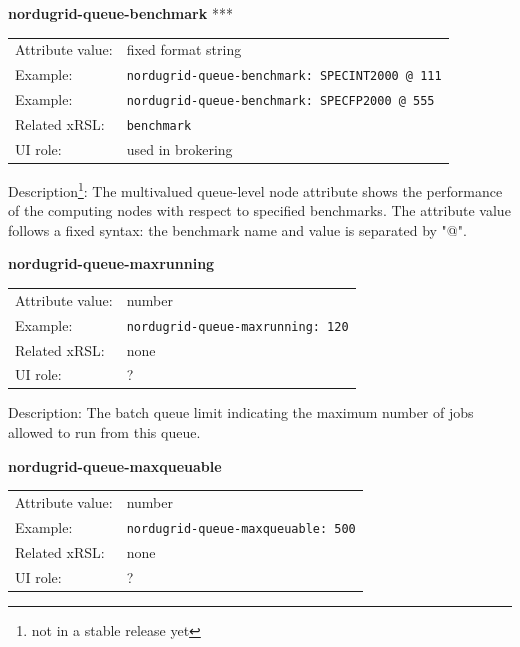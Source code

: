 \documentclass{article}
\begin{document}
  \hspace*{0.5cm}
  \begin{shaded}
    \textbf{nordugrid-queue-benchmark} ***
  \end{shaded}
  \begin{tabular}{lp{10cm}}  
    Attribute value:& fixed format string\\
    Example:& \verb#nordugrid-queue-benchmark: SPECINT2000 @ 111#\\
    Example:& \verb#nordugrid-queue-benchmark: SPECFP2000 @ 555#\\    
    Related xRSL:& \verb#benchmark#\\
    UI role:& used in brokering\\
  \end{tabular}

Description\footnote{not in a stable release yet}: The multivalued queue-level node attribute shows the 
performance of the computing nodes with respect to specified benchmarks.
The attribute value follows a fixed syntax: the benchmark name 
and value is separated by "@".



  \hspace*{0.5cm}
  \begin{shaded}
    \textbf{nordugrid-queue-maxrunning}
  \end{shaded}
  \begin{tabular}{lp{10cm}}  
    Attribute value:& number\\
    Example:& \verb#nordugrid-queue-maxrunning: 120#\\
    Related xRSL:& none\\
    UI role:& ?\\
  \end{tabular}

Description: The batch queue limit indicating the 
maximum number of jobs allowed to run from this queue.



  \hspace*{0.5cm}
  \begin{shaded}
    \textbf{nordugrid-queue-maxqueuable}
  \end{shaded}
  \begin{tabular}{lp{10cm}}  
    Attribute value:& number\\
    Example:& \verb#nordugrid-queue-maxqueuable: 500#\\
    Related xRSL:& none\\
    UI role:& ?\\
  \end{tabular}
\end{document}
